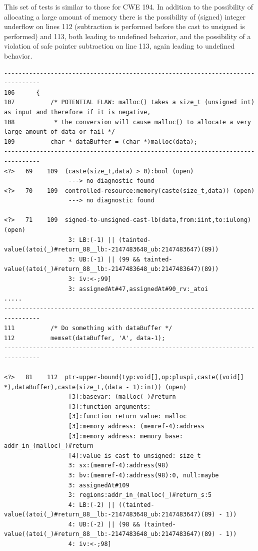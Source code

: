 \documentclass[11pt]{article}
\begin{document}
This set of tests is similar to those for CWE 194. In addition to the possibility  of
allocating a large amount of memory there is the possibility of (signed) integer
underflow on lines 112 (subtraction is performed before the cast to unsigned is performed)
and 113, both leading to undefined behavior, and the possibility of a violation of
safe pointer subtraction on line 113, again leading to undefined behavior.
\begin{tiny}
\begin{verbatim}
--------------------------------------------------------------------------------
106      {
107          /* POTENTIAL FLAW: malloc() takes a size_t (unsigned int) as input and therefore if it is negative,
108           * the conversion will cause malloc() to allocate a very large amount of data or fail */
109          char * dataBuffer = (char *)malloc(data);
--------------------------------------------------------------------------------
<?>   69    109  (caste(size_t,data) > 0):bool (open)
                  ---> no diagnostic found
<?>   70    109  controlled-resource:memory(caste(size_t,data)) (open)
                  ---> no diagnostic found
 
<?>   71    109  signed-to-unsigned-cast-lb(data,from:iint,to:iulong) (open)
                  3: LB:(-1) || (tainted-value((atoi(_)#return_88__lb:-2147483648_ub:2147483647)(89))
                  3: UB:(-1) || (99 && tainted-value((atoi(_)#return_88__lb:-2147483648_ub:2147483647)(89))
                  3: iv:<-;99]
                  3: assignedAt#47,assignedAt#90_rv:_atoi
..... 
--------------------------------------------------------------------------------
111          /* Do something with dataBuffer */
112          memset(dataBuffer, 'A', data-1);
--------------------------------------------------------------------------------

<?>   81    112  ptr-upper-bound(typ:void[],op:pluspi,caste((void[] *),dataBuffer),caste(size_t,(data - 1):int)) (open)
                  [3]:basevar: (malloc(_)#return
                  [3]:function arguments: _
                  [3]:function return value: malloc
                  [3]:memory address: (memref-4):address
                  [3]:memory address: memory base: addr_in_(malloc(_)#return
                  [4]:value is cast to unsigned: size_t
                  3: sx:(memref-4):address(98)
                  3: bv:(memref-4):address(98):0, null:maybe
                  3: assignedAt#109
                  3: regions:addr_in_(malloc(_)#return_s:5
                  4: LB:(-2) || ((tainted-value((atoi(_)#return_88__lb:-2147483648_ub:2147483647)(89) - 1))
                  4: UB:(-2) || (98 && (tainted-value((atoi(_)#return_88__lb:-2147483648_ub:2147483647)(89) - 1))
                  4: iv:<-;98]


\end{verbatim}
\end{tiny}
\end{document}
